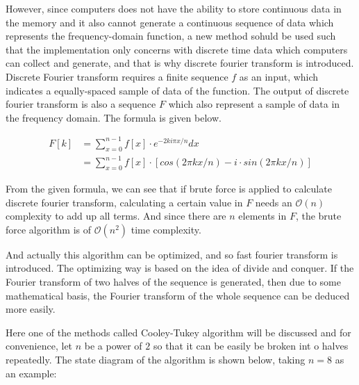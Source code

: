 \documentclass{article}
\begin{document}
However, since computers does not have the ability to store continuous data in the memory and it also cannot generate a continuous sequence of data which represents the frequency-domain function, a new method sohuld be used such that the implementation only concerns with discrete time data which computers can collect and generate, and that is why discrete fourier transform is introduced. Discrete Fourier transform requires a finite sequence $f$ as an input, which indicates a equally-spaced sample of data of the function. The output of discrete fourier transform is also a sequence $F$ which also represent a sample of data in the frequency domain. The formula is given below.

\begin{align*}
    F[k] &= \sum_{x=0}^{n-1}f[x]\cdot e^{-2ki\pi x/n}dx\\
    &=\sum_{x=0}^{n-1}f[x]\cdot[cos(2\pi kx/n)-i\cdot sin(2\pi kx/n)]
\end{align*}

From the given formula, we can see that if brute force is applied to calculate discrete fourier transform, calculating a certain value in $F$ needs an $\mathcal{O}(n)$ complexity to add up all terms. And since there are $n$ elements in $F$, the brute force algorithm is of $\mathcal{O}(n^2)$ time complexity.

And actually this algorithm can be optimized, and so fast fourier transform is introduced. The optimizing way is based on the idea of divide and conquer. If the Fourier transform of two halves of the sequence is generated, then due to some mathematical basis, the Fourier transform of the whole sequence can be deduced more easily.

Here one of the methods called Cooley-Tukey algorithm will be discussed and for convenience, let $n$ be a power of $2$ so that it can be easily be broken int o halves repeatedly. The state diagram of the algorithm is shown below, taking $n=8$ as an example:
\end{document}
